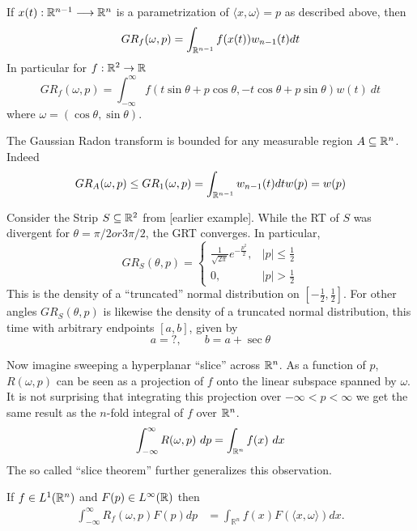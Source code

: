 \begin{myexample}
  If $x(t):\mathbb{R}^{n-1} \longrightarrow \mathbb{R}^n$ is a parametrization of $\langle x, \omega\rangle = p$ as described above, then
  \[
    GR_f(\omega, p) = \int_{\mathbb{R}^{n-1}}f(x(t)) w_{n-1}(t) dt
  \]
  In particular for $f:\mathbb{R}^2 \rightarrow \mathbb{R}$
  \[
    GR_f(\omega, p) = \int_{-\infty}^\infty f(t \sin \theta + p \cos \theta, -t \cos \theta + p \sin \theta) w(t)~dt
  \]
  where $\omega = (\cos \theta, \sin \theta)$.
\end{myexample}

\begin{myexample}
  The Gaussian Radon transform is bounded for any measurable region $A \subseteq \mathbb{R}^n$. Indeed 
  \[
      GR_A(\omega, p) \leq GR_1(\omega, p) = \int_{\mathbb{R}^{n-1}} w_{n-1}(t)dt w(p) = w(p)
  \]
\end{myexample}

\begin{myexample}
  Consider the Strip $S \subseteq \mathbb{R}^2$ from [earlier example]. While the RT of $S$ was divergent for $\theta = \pi/2 or 3\pi/2$, the GRT converges. In particular,
  \[
    GR_S(\theta, p)
    = \begin{cases}
      \frac1{\sqrt{2\pi}}e^{-\frac{p^2}2}, & |p| \leq \frac12 \\
      0, & |p| > \frac12
    \end{cases}
  \]
  This is the density of a ``truncated'' normal distribution on $[-\frac12,\frac12]$. For other angles $GR_S(\theta, p)$ is likewise the density of a truncated normal distribution, this time with arbitrary endpoints $[a, b]$, given by
  \[
    a = ?, \qquad b = a + \sec\theta
  \]
\end{myexample}

Now imagine sweeping a hyperplanar ``slice'' across $\mathbb{R}^n$. As a function of $p$, $R(\omega, p)$ can be seen as a projection of $f$ onto the linear subspace spanned by $\omega$. It is not surprising that integrating this projection over $-\infty < p < \infty$ we get the same result as the $n$-fold integral of $f$ over $\mathbb{R}^n$.
\[
    \int_{-\infty}^\infty R(\omega, p) ~dp = \int_{\mathbb{R}^n} f(x) ~dx
\]
The so called ``slice theorem'' further generalizes this observation.
\begin{proposition}
  If $f \in L^1(\mathbb{R}^n)$ and $F(p) \in L^\infty(\mathbb{R})$ then
  \begin{align}
    \label{eq:ST}
    \int_{-\infty}^\infty R_f(\omega, p) F(p) dp 
    &= \int_{\mathbb{R}^n} f(x) F(\langle x, \omega \rangle) dx.
  \end{align}
\end{proposition}

